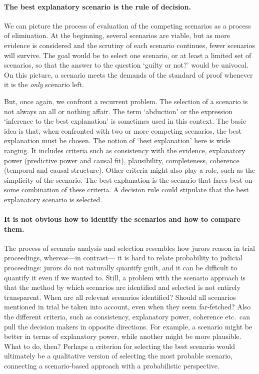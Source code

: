 \documentclass[10pt]{article}
\begin{document}
\paragraph{The best explanatory scenario is the rule of decision.}

We can picture the process of evaluation of the competing scenarios as a process of elimination. 
At the beginning, several scenarios are viable, but as more evidence is considered and the scrutiny of each scenario continues,
fewer scenarios will survive. The goal would be to select one scenario, or at least a limited set of scenarios, so that 
the answer to the question `guilty or not?' would be univocal. On this picture, a scenario meets the demands of the standard 
of proof whenever it is the \textit{only} scenario left.

But, once again, we confront a recurrent problem. The selection of a scenario is not always an all or nothing affair.
The term `abduction' or the expression `inference to the best explanation' is sometimes used in this context. The basic idea is that, when confronted 
with two or more competing scenarios, the best explanation must be chosen. The notion of `best explanation' here is wide ranging. It includes criteria such as 
consistency with the evidence, explanatory power (predictive power and causal fit), plausibility, completeness, coherence (temporal and causal structure). 
Other criteria might also play a role, such as the simplicity of the scenario. The best explanation is the scenario that fares 
best on some combination of these criteria. %
A decision rule could stipulate that the best explanatory scenario %
is selected. 


\paragraph{It is not obvious how to identify the scenarios and how to compare them.}

The process of scenario analysis and selection resembles how jurors reason in trial proceedings, whereas---in contrast---%
it is hard to relate probability to judicial proceedings: jurors do not 
naturally quantify guilt, and it can be difficult to quantify it even if we wanted to. Still, a problem with the scenario approach is that 
the method by which scenarios are identified and selected is not entirely transparent. When are all relevant scenarios identified? Should all scenarios mentioned in trial be taken into account, even when they seem far-fetched? Also the different criteria, such as consistency, explanatory power, coherence etc.\ 
can pull the decision makers in opposite directions. For example, a scenario might be better in terms of explanatory power, while another might 
be more plausible. What to do, then? Perhaps a criterion for selecting the best scenario would ultimately be a qualitative version of selecting the most probable scenario, connecting a scenario-based approach with a probabilistic perspective. 
\end{document}
